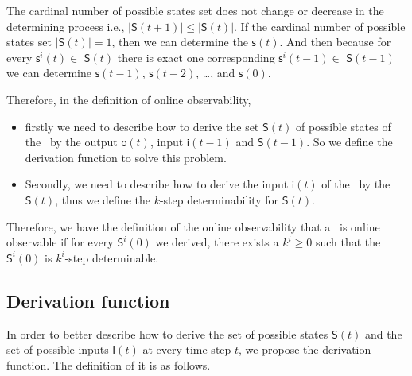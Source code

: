  The cardinal number of possible states set does not change or decrease in the determining process i.e., $|\mathsf{S}(t+1)|\le|\mathsf{S}(t)|$. %
 If the cardinal number of possible states set $|\mathsf{S}(t)|=1$, then we can determine the $\mathsf{s}(t)$. And then because for every $\mathsf{s}^{i}(t)\in $ $\mathsf{S}(t)$ there is exact one corresponding $\mathsf{s}^{i}(t-1)\in $ $\mathsf{S}(t-1)$ we can determine $\mathsf{s}(t-1)$, $\mathsf{s}(t-2)$, \ldots, and $\mathsf{s}(0)$.

Therefore, in the definition of online observability, 
\begin{itemize}
\item firstly we need to describe how to derive the set $\mathsf{S}(t)$ of possible states of the \BCN\ by the output $\mathsf{o}(t)$, input $\mathsf{i}(t-1)$ and $\mathsf{S}(t-1)$. So we define the derivation function to solve this problem.
\item  Secondly, we need to describe how to derive the input $\mathsf{i}(t)$ of the \BCN\ by the $\mathsf{S}(t)$, thus we define the $k$-step determinability for $\mathsf{S}(t)$. 
\end{itemize} 

Therefore, we have the definition of the online observability that a \BCN\ is online observable if for every $\mathsf{S}^{i}(0)$ we derived, there exists a $k^i\ge 0$ such that the $\mathsf{S}^{i}(0)$ is $k^i$-step determinable.


\subsection{Derivation function}

In order to better describe how to derive the set of possible states $\mathsf{S}(t)$ and the set of possible inputs $\mathsf{I}(t)$ at every time step $t$, we propose the derivation function. The definition of it is as follows.

